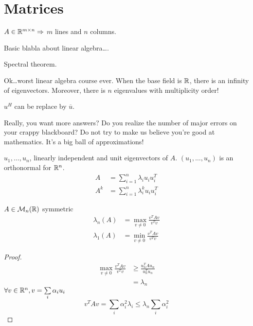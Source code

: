 \section{Matrices}

$A \in \mathbb{R}^{m \times n} \Rightarrow$ $m$ lines and $n$ columns.

Basic blabla about linear algebra\dots.

Spectral theorem.

Ok\dots worst linear algebra course ever. When the base field is $\mathbb{R}$, there is an infinity of eigenvectors. Moreover, there is $n$ eigenvalues with multiplicity order!

$u^H$ can be replace by $\overline{u}$.

Really, you want more answers? Do you realize the number of major errors on your crappy blackboard? Do not try to make us believe you're good at mathematics. It's a big ball of approximations!

\begin{proposition}
    $u_1,\ldots,u_n$, linearly independent and unit eigenvectors of $A$. $(u_1,\ldots,u_n)$ is an orthonormal for $\mathbb{R}^n$.
    \[
        \begin{aligned}
            A &= \sum\limits_{i=1}^n \lambda_i u_i u_i^T\\
            A^k &= \sum\limits_{i=1}^n \lambda_i^k u_i u_i^T
        \end{aligned}
    \]
\end{proposition}

\begin{proposition}
    $A \in \mathcal{M}_n(\mathbb{R})$ symmetric
    \[
        \begin{aligned}
            \lambda_n(A) &= \max\limits_{v\neq 0} \frac{v^TAv}{v^Tv}\\
            \lambda_1(A) &= \min\limits_{v\neq 0} \frac{v^TAv}{v^Tv}
        \end{aligned}            
    \]
\end{proposition}
\begin{proof}
    \[
        \begin{aligned}
            \max\limits_{v \neq 0} \frac{v^TAv}{v^Tv} &\geqslant \frac{u_n^TAu_n}{u_n^Tu_n}\\
            &=\lambda_n
        \end{aligned}
    \]
    $\forall v \in \mathbb{R}^n, v = \sum\limits_i \alpha_i u_i$
    \[
        v^T A v = \sum\limits_i \alpha_i^2 \lambda_i \leqslant \lambda_n \sum\limits_i \alpha_i^2
    \]
\end{proof}

